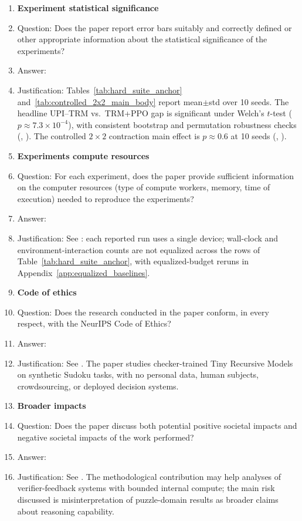 \documentclass{article}
\theoremstyle{plain}
\theoremstyle{definition}
\theoremstyle{remark}
\begin{document}
\begin{enumerate}[leftmargin=*,itemsep=0.35em,topsep=0.35em]
\item {\bf Experiment statistical significance}
    \item[] Question: Does the paper report error bars suitably and correctly defined or other appropriate information about the statistical significance of the experiments?
    \item[] Answer: \answerYes{}
    \item[] Justification: Tables~\ref{tab:hard_suite_anchor} and~\ref{tab:controlled_2x2_main_body} report mean$\pm$std over 10 seeds. The headline UPI--TRM vs.\ TRM+PPO gap is significant under Welch's $t$-test ($p\approx 7.3\times 10^{-4}$), with consistent bootstrap and permutation robustness checks (, ). The controlled $2\times 2$ contraction main effect is $p\approx 0.6$ at 10 seeds (, ).

\item {\bf Experiments compute resources}
    \item[] Question: For each experiment, does the paper provide sufficient information on the computer resources (type of compute workers, memory, time of execution) needed to reproduce the experiments?
    \item[] Answer: \answerYes{}
    \item[] Justification: See : each reported run uses a single device; wall-clock and environment-interaction counts are not equalized across the rows of Table~\ref{tab:hard_suite_anchor}, with equalized-budget reruns in Appendix~\ref{app:equalized_baselines}.

\item {\bf Code of ethics}
    \item[] Question: Does the research conducted in the paper conform, in every respect, with the NeurIPS Code of Ethics?
    \item[] Answer: \answerYes{}
    \item[] Justification: See . The paper studies checker-trained Tiny Recursive Models on synthetic Sudoku tasks, with no personal data, human subjects, crowdsourcing, or deployed decision systems.

\item {\bf Broader impacts}
    \item[] Question: Does the paper discuss both potential positive societal impacts and negative societal impacts of the work performed?
    \item[] Answer: \answerYes{}
    \item[] Justification: See . The methodological contribution may help analyses of verifier-feedback systems with bounded internal compute; the main risk discussed is misinterpretation of puzzle-domain results as broader claims about reasoning capability.


\end{enumerate}
\end{document}
